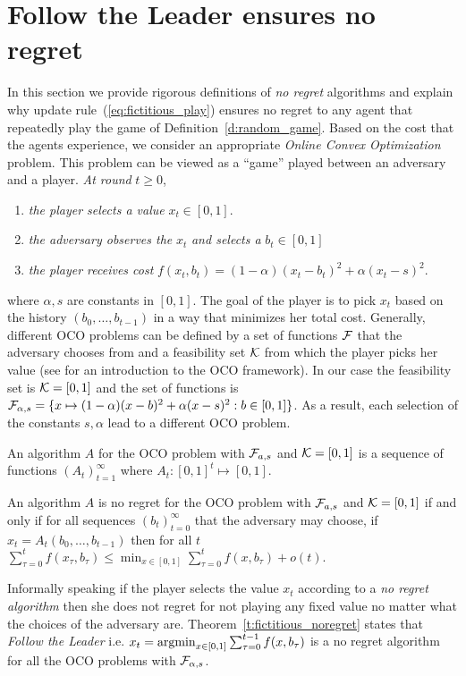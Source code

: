 \section{Follow the Leader ensures no regret}\label{s:fictitious_noregret}

In this section we provide rigorous definitions of \emph{no regret} algorithms
and explain why update rule~(\ref{eq:fictitious_play}) ensures
no regret to any agent that repeatedly play the game of
Definition~\ref{d:random_game}.
Based on the cost that the agents experience,
we consider an appropriate \emph{Online Convex Optimization} problem.
This problem can be viewed as a \enquote{game} played between an
adversary and a player. \emph{At round }$t\geq 0$,
\begin{enumerate}
  \item \emph{the player selects a value }$x_t \in [0,1]$.
  \item \emph{the adversary observes the }$x_t$ \emph{and selects a} $b_t \in [0,1]$
  \item \emph{the player receives cost} $f(x_t,b_t)=(1-\alpha)(x_t-b_t)^2 + \alpha(x_t -s)^2$.
\end{enumerate}
where $\alpha,s$ are constants in $[0,1]$. The goal of
the player is to pick $x_t$ based on the history
$(b_0,\ldots,b_{t-1})$ in a way that minimizes her total cost.
Generally, different OCO problems can be defined by a set of functions
$\mathcal{F}$ that the adversary chooses from and a feasibility
set $\mathcal{K}$ from which the player picks her value (see \cite{Haz16}
for an introduction to the OCO framework).
In our case the feasibility set is $\mathcal{K}=[0,1]$ and the set of functions
is
$\mathcal{F}_{\alpha,s} = \{x \mapsto (1-\alpha)(x-b)^2 + \alpha(x -s)^2 : b \in [0,1]\}$.
As a result, each selection of the
constants $s,\alpha$ lead to a different OCO problem.

\begin{definition}\label{d:OCO_algo}
An algorithm $A$ for the OCO problem with $\mathcal{F}_{a,s}$ and
$\mathcal{K}=[0,1]$ is a sequence of functions $(A_t)_{t=1}^\infty$ where $A_t:[0,1]^t \mapsto [0,1]$.
\end{definition}

\begin{definition}\label{d:no_regret_algo}
An algorithm $A$ is no regret for the OCO problem with $\mathcal{F}_{a,s}$ and
$\mathcal{K}=[0,1]$ if and only if for all sequences $(b_t)_{t=0}^\infty$ that the
adversary may choose, if $x_t = A_t(b_0,\dots,b_{t-1})$ then for all $t$
\(\sum_{\tau=0}^t f(x_\tau,b_\tau)  \leq \min_{x \in [0,1]}\sum_{\tau=0}^t f(x,b_\tau) + o(t).\)
\end{definition}
Informally speaking if the player selects the value
$x_t$ according to a \emph{no regret algorithm} then
she does not regret for not playing any fixed value no
matter what the choices of the adversary are.
Theorem~\ref{t:fictitious_noregret} states that
\emph{Follow the Leader} i.e. $x_t = \operatorname*{argmin}_{x \in [0,1]}\sum_{\tau=0}^{t-1}f(x,b_\tau)$
is a no regret algorithm for all the OCO problems with $\mathcal{F}_{\alpha,s}$.

